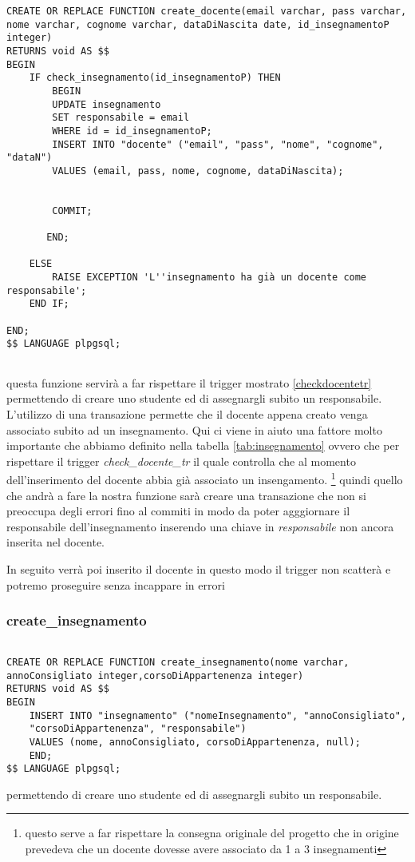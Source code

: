 \begin{lstlisting}[style=sqlStyle]
CREATE OR REPLACE FUNCTION create_docente(email varchar, pass varchar, nome varchar, cognome varchar, dataDiNascita date, id_insegnamentoP integer)
RETURNS void AS $$
BEGIN
    IF check_insegnamento(id_insegnamentoP) THEN
        BEGIN
        UPDATE insegnamento
        SET responsabile = email
        WHERE id = id_insegnamentoP;
        INSERT INTO "docente" ("email", "pass", "nome", "cognome", "dataN")
        VALUES (email, pass, nome, cognome, dataDiNascita);
        
      
        COMMIT;
        
       END;
        
    ELSE
        RAISE EXCEPTION 'L''insegnamento ha già un docente come responsabile';
    END IF;
    
END;
$$ LANGUAGE plpgsql;


\end{lstlisting}
questa funzione servirà a far rispettare il trigger mostrato \ref{checkdocentetr}  permettendo di creare uno studente ed di assegnargli subito un responsabile. 
L'utilizzo di una transazione permette che il docente appena creato venga associato subito ad un insegnamento.
Qui ci viene in aiuto  una fattore molto importante che abbiamo definito nella tabella \ref{tab:insegnamento} ovvero che per rispettare il trigger \textit{check\_docente\_tr} il quale controlla che al momento dell'inserimento del docente abbia già associato un insengamento.
\footnote{questo serve a far rispettare la consegna originale del progetto che in origine prevedeva che un docente dovesse avere associato da 1 a 3 insegnamenti}
quindi quello che andrà a fare la nostra funzione sarà creare una transazione che non si preoccupa degli errori fino al commiti in modo da poter agggiornare il responsabile dell'insegnamento inserendo una chiave in \textit{responsabile} non ancora inserita nel docente.

In seguito verrà poi inserito il docente in questo modo il trigger non scatterà e potremo proseguire senza incappare in errori

\subsubsection{create\_insegnamento}\label{createInseganemento}

\begin{lstlisting}[style=sqlStyle]

CREATE OR REPLACE FUNCTION create_insegnamento(nome varchar,
annoConsigliato integer,corsoDiAppartenenza integer)
RETURNS void AS $$
BEGIN
    INSERT INTO "insegnamento" ("nomeInsegnamento", "annoConsigliato",
    "corsoDiAppartenenza", "responsabile")
    VALUES (nome, annoConsigliato, corsoDiAppartenenza, null);
    END;
$$ LANGUAGE plpgsql;
\end{lstlisting}
permettendo di creare uno studente ed di assegnargli subito un responsabile. 
